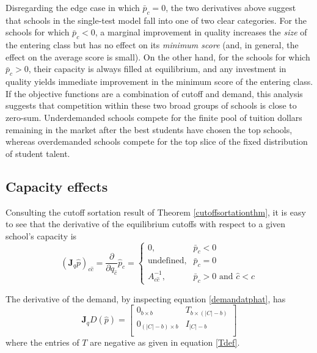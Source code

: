 \documentclass[12pt]{article}
\numberwithin{equation}{subsection}
\theoremstyle{definition}
\begin{document}
Disregarding the edge case in which $\bar p_c = 0$, the two derivatives above suggest that schools in the single-test model fall into one of two clear categories. For the schools for which $\bar p_c < 0$, a marginal improvement in quality increases the \emph{size} of the entering class but has no effect on its \emph{minimum score} (and, in general, the effect on the average score is small). On the other hand, for the schools for which $\bar p_c > 0$, their capacity is always filled at equilibrium, and any investment in quality yields immediate improvement in the minimum score of the entering class. If the objective functions are a combination of cutoff and demand, this analysis suggests that competition within these two broad groups of schools is close to zero-sum. Underdemanded schools compete for the finite pool of tuition dollars remaining in the market after the best students have chosen the top schools, whereas overdemanded schools compete for the top slice of the fixed distribution of student talent.

\subsection{Capacity effects}
Consulting the cutoff sortation result of Theorem \ref{cutoffsortationthm}, it is easy to see that the derivative of the equilibrium cutoffs with respect to a given school's capacity is
\begin{equation}\label{jac-q-p}
\left(\mathbf{J}_q \hat p\right)_{c\hat c} =
\frac{\partial}{\partial q_{\hat c}} \hat p_c = \begin{cases}
0, & \bar p_c < 0 \\
\text{undefined}, & \bar p_c = 0 \\
A^{-1}_{c \hat c}, & \bar p_c > 0 \text{ and }\hat c < c 
\end{cases}
\end{equation}

The derivative of the demand, by inspecting equation \eqref{demandatphat}, has
\begin{equation}\mathbf{J}_q D(\hat p) =
\begin{bmatrix}
0_{b \times b} & T_{b \times (|C| - b)} \\
0_{(|C| - b) \times b} & I_{|C| - b} \\
\end{bmatrix} 
\end{equation}
where the entries of $T$ are negative as given in equation \eqref{Tdef}.
\end{document}
